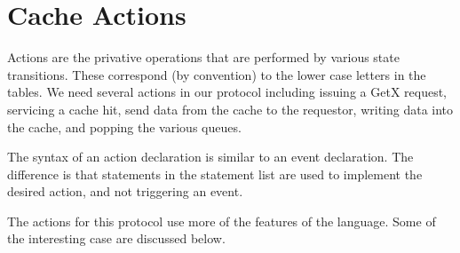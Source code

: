 \documentclass[11pt]{article}
\begin{document}
\section*{Cache Actions}

Actions are the privative operations that are performed by various
state transitions.  These correspond (by convention) to the lower case
letters in the tables.  We need several actions in our protocol
including issuing a GetX request, servicing a cache hit, send data
from the cache to the requestor, writing data into the cache, and
popping the various queues.  

The syntax of an action declaration is similar to an event
declaration.  The difference is that statements in the statement list
are used to implement the desired action, and not triggering an event.


The actions for this protocol use more of the features of the
language.  Some of the interesting case are discussed below.
\end{document}
